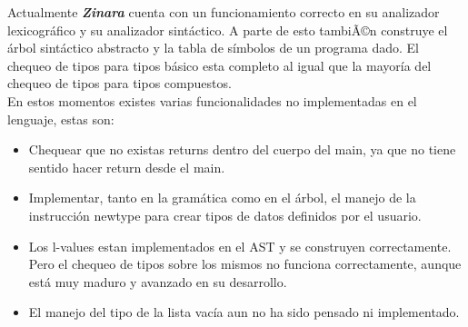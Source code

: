 \documentclass[12pt, spanish]{report}
\begin{document}
Actualmente \emph{\textbf{Zinara}} cuenta con un funcionamiento
correcto en su analizador lexicogr\'afico y su analizador sint\'actico. A
parte de esto tambiÃ©n construye el \'arbol sint\'actico abstracto y la
tabla de s\'imbolos de un programa dado. El chequeo de tipos para tipos
b\'asico esta completo al igual que la mayor\'ia del chequeo de tipos
para tipos compuestos.\\
\indent En estos momentos existes varias funcionalidades no
implementadas en el lenguaje, estas son:
\begin{itemize}
\item Chequear que no existas returns dentro del cuerpo del main, ya que
      no tiene sentido hacer return desde el main.
\item Implementar, tanto en la gram\'atica como en el \'arbol, el manejo
      de la instrucci\'on newtype para crear tipos de datos definidos
      por el usuario.
\item Los l-values estan implementados en el AST y se construyen
      correctamente. Pero el chequeo de tipos sobre los mismos no
      funciona correctamente, aunque est\'a muy maduro y avanzado en su
      desarrollo.
\item El manejo del tipo de la lista vac\'ia aun no ha sido pensado ni
      implementado.
\end{itemize}



\end{document}
